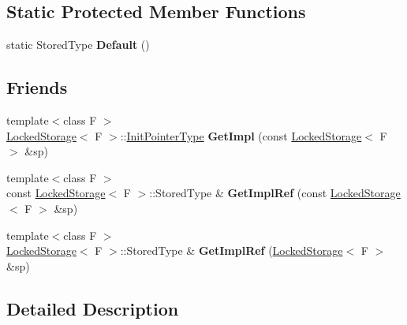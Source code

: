\subsection*{Static Protected Member Functions}
\begin{DoxyCompactItemize}
\item 
\hypertarget{classLoki_1_1LockedStorage_a701c5035e513f58a2e1e853a6f353fec}{}static Stored\+Type {\bfseries Default} ()\label{classLoki_1_1LockedStorage_a701c5035e513f58a2e1e853a6f353fec}

\end{DoxyCompactItemize}
\subsection*{Friends}
\begin{DoxyCompactItemize}
\item 
\hypertarget{classLoki_1_1LockedStorage_a0bccb4ab9e91411e9503377cb58f31b8}{}{\footnotesize template$<$class F $>$ }\\\hyperlink{classLoki_1_1LockedStorage}{Locked\+Storage}$<$ F $>$\+::\hyperlink{classLoki_1_1LockedStorage_a77b3c2a08c0d43a83b447d9c2c34bbb6}{Init\+Pointer\+Type} {\bfseries Get\+Impl} (const \hyperlink{classLoki_1_1LockedStorage}{Locked\+Storage}$<$ F $>$ \&sp)\label{classLoki_1_1LockedStorage_a0bccb4ab9e91411e9503377cb58f31b8}

\item 
\hypertarget{classLoki_1_1LockedStorage_a8de340e8a5bc5dba6bbf517b9ca90bf6}{}{\footnotesize template$<$class F $>$ }\\const \hyperlink{classLoki_1_1LockedStorage}{Locked\+Storage}$<$ F $>$\+::Stored\+Type \& {\bfseries Get\+Impl\+Ref} (const \hyperlink{classLoki_1_1LockedStorage}{Locked\+Storage}$<$ F $>$ \&sp)\label{classLoki_1_1LockedStorage_a8de340e8a5bc5dba6bbf517b9ca90bf6}

\item 
\hypertarget{classLoki_1_1LockedStorage_aa4db569de2c5162102a6f1fad8f2f662}{}{\footnotesize template$<$class F $>$ }\\\hyperlink{classLoki_1_1LockedStorage}{Locked\+Storage}$<$ F $>$\+::Stored\+Type \& {\bfseries Get\+Impl\+Ref} (\hyperlink{classLoki_1_1LockedStorage}{Locked\+Storage}$<$ F $>$ \&sp)\label{classLoki_1_1LockedStorage_aa4db569de2c5162102a6f1fad8f2f662}

\end{DoxyCompactItemize}


\subsection{Detailed Description}

